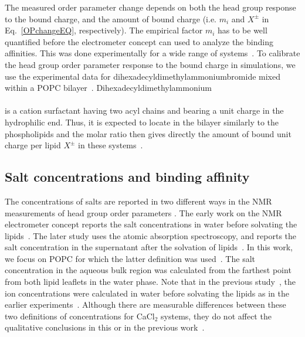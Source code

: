\documentclass[aip,jcp,twocolumn]{revtex4}
\begin{document}
The measured order parameter change depends on both the head group response 
to the bound charge, and the amount of bound charge 
(i.e. $m_i$ and $X^\pm$ in Eq.~\ref{OPchangeEQ}, respectively). 
The empirical factor $m_i$ has to be
well quantified before the electrometer concept can used to 
analyze the binding affinities.
This was done experimentally for a wide range
of systems~\cite{seelig87,beschiasvili91}. To calibrate 
the head group order parameter response to the bound charge in simulations,
we use the experimental data for dihexadecyldimethylammoniumbromide %
mixed within a POPC bilayer~\cite{scherer89}. Dihexadecyldimethylammonium\\[0.5cm]
\vspace{0.5cm} \\
is a cation surfactant having two acyl chains and bearing a unit
charge in the hydrophilic end. Thus, it is expected to locate
in the bilayer similarly to the phospholipids and the molar ratio then 
gives directly the amount of bound unit charge per lipid $X^\pm$ in these systems~\cite{scherer89}.

\subsection{Salt concentrations and binding affinity}
The concentrations of salts are reported in two different ways
in the NMR measurements of head group order parameters \cite{akutsu81, altenbach84}.
The early work on the NMR electrometer concept 
reports the salt concentrations in water before solvating
the lipids~\cite{akutsu81}. 
The later study uses the atomic absorption
spectroscopy, and reports the salt concentration in the supernatant after the
solvation of lipids~\cite{altenbach84}.
In this work, we focus on POPC for which the latter definition was used~\cite{altenbach84}.
The salt concentration in the aqueous bulk region was calculated from 
the farthest point from both lipid leaflets in the water phase. 
Note that in the previous study~\cite{catte16},
the ion concentrations were calculated in water before solvating the lipids 
as in the earlier experiments~\cite{akutsu81}.
Although there are measurable differences between these two
definitions of concentrations for CaCl$_2$ systems,
they do not affect the qualitative conclusions in this or in the previous work~\cite{catte16}.
\end{document}
